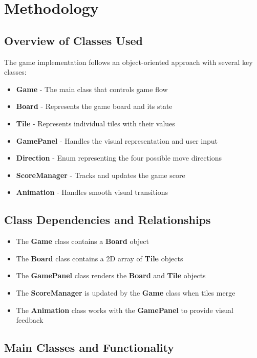 \documentclass[12pt, a4paper]{article}
\begin{document}
\section{Methodology}

\subsection{Overview of Classes Used}
The game implementation follows an object-oriented approach with several key classes:

\begin{itemize}
    \item \textbf{Game} - The main class that controls game flow
    \item \textbf{Board} - Represents the game board and its state
    \item \textbf{Tile} - Represents individual tiles with their values
    \item \textbf{GamePanel} - Handles the visual representation and user input
    \item \textbf{Direction} - Enum representing the four possible move directions
    \item \textbf{ScoreManager} - Tracks and updates the game score
    \item \textbf{Animation} - Handles smooth visual transitions
\end{itemize}

\subsection{Class Dependencies and Relationships}
\begin{itemize}
    \item The \textbf{Game} class contains a \textbf{Board} object
    \item The \textbf{Board} class contains a 2D array of \textbf{Tile} objects
    \item The \textbf{GamePanel} class renders the \textbf{Board} and \textbf{Tile} objects
    \item The \textbf{ScoreManager} is updated by the \textbf{Game} class when tiles merge
    \item The \textbf{Animation} class works with the \textbf{GamePanel} to provide visual feedback
\end{itemize}

\subsection{Main Classes and Functionality}
\end{document}
